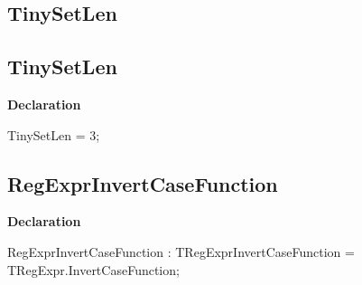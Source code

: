 \documentclass{report}
\newif\ifpdf
\begin{document}
\subsection*{\large{\textbf{TinySetLen}}\normalsize\hspace{1ex}\hrulefill}
\else
\subsection*{TinySetLen}
\fi
\label{RegExpr-TinySetLen}
\begin{list}{}{
\setlength{\itemindent}{0cm}
\setlength{\listparindent}{0cm}
\setlength{\leftmargin}{\evensidemargin}
\addtolength{\leftmargin}{\tmplength}
\settowidth{\labelsep}{X}
\addtolength{\leftmargin}{\labelsep}
\setlength{\labelwidth}{\tmplength}
}
\item[\textbf{Declaration}\hfill]
\ifpdf
\begin{flushleft}
\fi
\begin{ttfamily}
TinySetLen = 3;\end{ttfamily}

\ifpdf
\end{flushleft}
\fi

\end{list}
\ifpdf
\subsection*{\large{\textbf{RegExprInvertCaseFunction}}\normalsize\hspace{1ex}\hrulefill}
\else
\subsection*{RegExprInvertCaseFunction}
\fi
\label{RegExpr-RegExprInvertCaseFunction}
\begin{list}{}{
\setlength{\itemindent}{0cm}
\setlength{\listparindent}{0cm}
\setlength{\leftmargin}{\evensidemargin}
\addtolength{\leftmargin}{\tmplength}
\settowidth{\labelsep}{X}
\addtolength{\leftmargin}{\labelsep}
\setlength{\labelwidth}{\tmplength}
}
\item[\textbf{Declaration}\hfill]
\ifpdf
\begin{flushleft}
\fi
\begin{ttfamily}
RegExprInvertCaseFunction : TRegExprInvertCaseFunction =  TRegExpr.InvertCaseFunction;\end{ttfamily}

\ifpdf
\end{flushleft}
\fi

\end{list}
\end{document}
